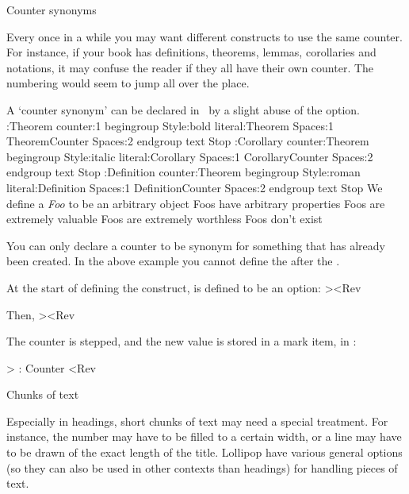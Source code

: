 \SubSection Counter synonyms

Every once in a while you may want different constructs to use the same
counter. For instance, if your book has definitions, theorems, lemmas,
corollaries and notations, it may confuse the reader if they all have
their own counter. The numbering would seem to jump all over the place.

A `counter synonym' can be declared in \Lollipop\ by a slight abuse of
the  option.
\Example
\DefineTextBlock:Theorem counter:1 begingroup Style:bold
 literal:Theorem Spaces:1 TheoremCounter Spaces:2 endgroup
 text Stop
\DefineTextBlock:Corollary counter:Theorem begingroup Style:italic
 literal:Corollary Spaces:1 CorollaryCounter Spaces:2 endgroup
 text Stop
\DefineTextBlock:Definition counter:Theorem begingroup Style:roman
 literal:Definition Spaces:1 DefinitionCounter Spaces:2 endgroup
 text Stop
\Definition We define a {\it Foo} to be an arbitrary object\>
\Theorem Foos have arbitrary properties\>
\Corollary Foos are extremely valuable\>
\Corollary Foos are extremely worthless\>
\Theorem Foos don't exist\>
\ExampleStop

You can only declare a counter to be synonym for something that has
already been created. In the above example you cannot define the
 after the .

\ImpNote
At the start of defining the construct,  is defined to
be an option:
\Ver><Rev

Then,
\Ver>\add@generic@stop@default{\ifhas@counter
    \xp\expandafter\xp\install@counter
           \xp\counter@repr\@space\fi}<Rev


The counter is stepped, and the new value is stored in a mark item,
in :

\Ver>
    \ifhas@counter 
       \nxp\StepCounter:\expandafter\@name\@space
       \ifhas@marks \edef\nxp\cs@e
              {\nxp\nxp\nxp{}
                {\@name Counter}{}}%
            \nxp\cs@e      
       \fi
       \fi<Rev
\ImpNoteStop

\Section Chunks of text

Especially in headings, short chunks of text may need a special
treatment. For instance, the number may have to be filled to a certain
width, or a line may have to be drawn of the exact length of the
title. Lollipop have various general options (so they can also be used
in other contexts than headings) for handling pieces of text.

